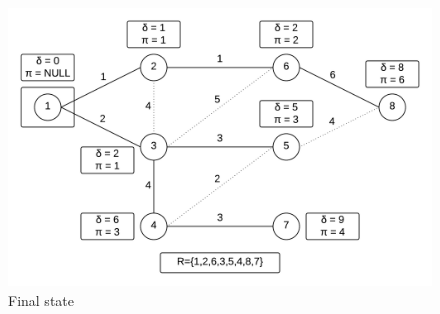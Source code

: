 \documentclass[12pt,letterpaper]{article}
\begin{document}
\begin{figure}
\centering
\includegraphics[width=12cm]{dfin}
\caption{Final state}
\end{figure}
\FloatBarrier
\end{document}
